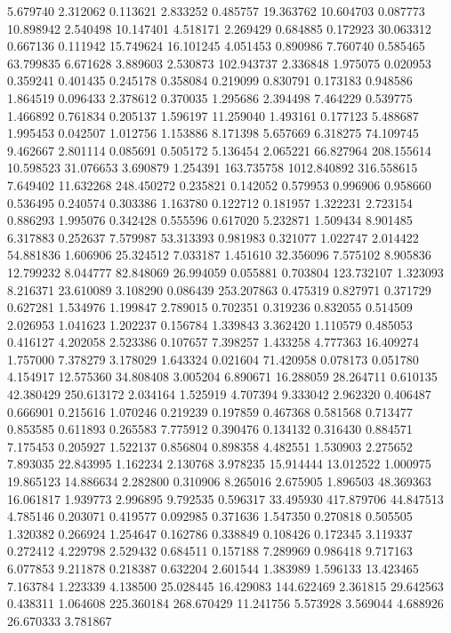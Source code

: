 5.679740
2.312062
0.113621
2.833252
0.485757
19.363762
10.604703
0.087773
10.898942
2.540498
10.147401
4.518171
2.269429
0.684885
0.172923
30.063312
0.667136
0.111942
15.749624
16.101245
4.051453
0.890986
7.760740
0.585465
63.799835
6.671628
3.889603
2.530873
102.943737
2.336848
1.975075
0.020953
0.359241
0.401435
0.245178
0.358084
0.219099
0.830791
0.173183
0.948586
1.864519
0.096433
2.378612
0.370035
1.295686
2.394498
7.464229
0.539775
1.466892
0.761834
0.205137
1.596197
11.259040
1.493161
0.177123
5.488687
1.995453
0.042507
1.012756
1.153886
8.171398
5.657669
6.318275
74.109745
9.462667
2.801114
0.085691
0.505172
5.136454
2.065221
66.827964
208.155614
10.598523
31.076653
3.690879
1.254391
163.735758
1012.840892
316.558615
7.649402
11.632268
248.450272
0.235821
0.142052
0.579953
0.996906
0.958660
0.536495
0.240574
0.303386
1.163780
0.122712
0.181957
1.322231
2.723154
0.886293
1.995076
0.342428
0.555596
0.617020
5.232871
1.509434
8.901485
6.317883
0.252637
7.579987
53.313393
0.981983
0.321077
1.022747
2.014422
54.881836
1.606906
25.324512
7.033187
1.451610
32.356096
7.575102
8.905836
12.799232
8.044777
82.848069
26.994059
0.055881
0.703804
123.732107
1.323093
8.216371
23.610089
3.108290
0.086439
253.207863
0.475319
0.827971
0.371729
0.627281
1.534976
1.199847
2.789015
0.702351
0.319236
0.832055
0.514509
2.026953
1.041623
1.202237
0.156784
1.339843
3.362420
1.110579
0.485053
0.416127
4.202058
2.523386
0.107657
7.398257
1.433258
4.777363
16.409274
1.757000
7.378279
3.178029
1.643324
0.021604
71.420958
0.078173
0.051780
4.154917
12.575360
34.808408
3.005204
6.890671
16.288059
28.264711
0.610135
42.380429
250.613172
2.034164
1.525919
4.707394
9.333042
2.962320
0.406487
0.666901
0.215616
1.070246
0.219239
0.197859
0.467368
0.581568
0.713477
0.853585
0.611893
0.265583
7.775912
0.390476
0.134132
0.316430
0.884571
7.175453
0.205927
1.522137
0.856804
0.898358
4.482551
1.530903
2.275652
7.893035
22.843995
1.162234
2.130768
3.978235
15.914444
13.012522
1.000975
19.865123
14.886634
2.282800
0.310906
8.265016
2.675905
1.896503
48.369363
16.061817
1.939773
2.996895
9.792535
0.596317
33.495930
417.879706
44.847513
4.785146
0.203071
0.419577
0.092985
0.371636
1.547350
0.270818
0.505505
1.320382
0.266924
1.254647
0.162786
0.338849
0.108426
0.172345
3.119337
0.272412
4.229798
2.529432
0.684511
0.157188
7.289969
0.986418
9.717163
6.077853
9.211878
0.218387
0.632204
2.601544
1.383989
1.596133
13.423465
7.163784
1.223339
4.138500
25.028445
16.429083
144.622469
2.361815
29.642563
0.438311
1.064608
225.360184
268.670429
11.241756
5.573928
3.569044
4.688926
26.670333
3.781867
